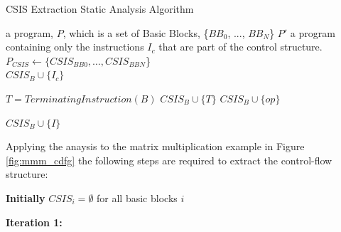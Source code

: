\begin{algorithm}[t]
\caption{CSIS Extraction Static Analysis Algorithm
\label{alg:CSIS-extraction}}
    \begin{algorithmic}
        \INPUT a program, $P$, which is a set of Basic Blocks, \{$BB_0$, ..., $BB_N$\}
        \OUTPUT $P'$ a program containing only the instructions $I_c$ that are part of the control structure.
        \Statex
            \State $P_{CSIS} \gets \{CSIS_{BB0}, \dots,  CSIS_{BBN}$\}
                \\\hrulefill
                        \State $CSIS_B \cup \{I_{c}\}$
                    \EndFor
                \EndFor
                \\\hrulefill

                \State $T = TerminatingInstruction(B)$
                \State $CSIS_{B} \cup \{T\}$
                    \State $CSIS_{B} \cup \{op\}$
                \EndFor
                \\\hrulefill

                                \State $CSIS_{B} \cup \{I\}$
                            \EndIf
                        \EndFor
                    \EndFor
                \EndFor
            \EndFor
        \EndWhile
    \end{algorithmic}
\end{algorithm}

Applying the anaysis to the matrix multiplication example in Figure \ref{fig:mmm_cdfg} the
following steps are required to extract the control-flow structure:

\vspace{1mm}
\noindent
\textbf{Initially} $CSIS_{i} = \emptyset$ for all basic blocks $i$

\vspace{-2mm}
\noindent
\hrulefill

\vspace{-1mm}
\noindent
\textbf{Iteration 1:}

